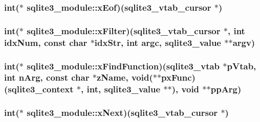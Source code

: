 \hypertarget{structsqlite3__module_ae10cf7d9a7edfecf1daa34a214bf6a64}{
\subsubsection[{x\-Eof}]{\setlength{\rightskip}{0pt plus 5cm}int($\ast$ sqlite3\-\_\-module\-::x\-Eof)({\bf sqlite3\-\_\-vtab\-\_\-cursor} $\ast$)}}\label{structsqlite3__module_ae10cf7d9a7edfecf1daa34a214bf6a64}
\hypertarget{structsqlite3__module_a1ddde32dcae461910096ebb2c42d1a6a}{
\subsubsection[{x\-Filter}]{\setlength{\rightskip}{0pt plus 5cm}int($\ast$ sqlite3\-\_\-module\-::x\-Filter)({\bf sqlite3\-\_\-vtab\-\_\-cursor} $\ast$, int idx\-Num, const char $\ast$idx\-Str, int argc, {\bf sqlite3\-\_\-value} $\ast$$\ast$argv)}}\label{structsqlite3__module_a1ddde32dcae461910096ebb2c42d1a6a}
\hypertarget{structsqlite3__module_ae70a020a7dda960b91943e9f67695dbb}{
\subsubsection[{x\-Find\-Function}]{\setlength{\rightskip}{0pt plus 5cm}int($\ast$ sqlite3\-\_\-module\-::x\-Find\-Function)({\bf sqlite3\-\_\-vtab} $\ast$p\-Vtab, int n\-Arg, const char $\ast$z\-Name, void($\ast$$\ast$px\-Func)({\bf sqlite3\-\_\-context} $\ast$, int, {\bf sqlite3\-\_\-value} $\ast$$\ast$), void $\ast$$\ast$pp\-Arg)}}\label{structsqlite3__module_ae70a020a7dda960b91943e9f67695dbb}
\hypertarget{structsqlite3__module_aa739d9a2081db7bf786f1f9fb9d92264}{
\subsubsection[{x\-Next}]{\setlength{\rightskip}{0pt plus 5cm}int($\ast$ sqlite3\-\_\-module\-::x\-Next)({\bf sqlite3\-\_\-vtab\-\_\-cursor} $\ast$)}}\label{structsqlite3__module_aa739d9a2081db7bf786f1f9fb9d92264}
